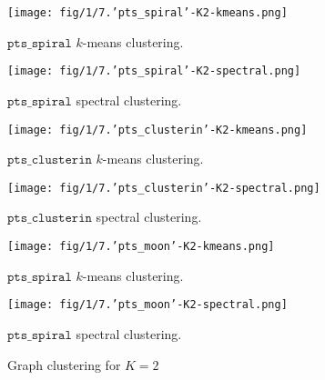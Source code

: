 \documentclass[unicode,11pt,a4paper,oneside,numbers=endperiod,openany]{scrartcl}
\begin{document}
\begin{figure}[h!]
\begin{minipage}{1\textwidth}
    \begin{minipage}{0.5\linewidth}
        \centering
        \texttt{[image: fig/1/7.'pts\_spiral'-K2-kmeans.png]}
        \caption{$\texttt {pts\_spiral}$ $k$-means clustering.}
    \end{minipage}
    \begin{minipage}{0.5\linewidth}
        \centering
        \texttt{[image: fig/1/7.'pts\_spiral'-K2-spectral.png]}
        \caption{$\texttt {pts\_spiral}$ spectral clustering.}
    \end{minipage}
    
    \begin{minipage}{0.5\linewidth}
        \centering
        \texttt{[image: fig/1/7.'pts\_clusterin'-K2-kmeans.png]}
        \caption{$\texttt {pts\_clusterin}$ $k$-means clustering.}
    \end{minipage}
    \begin{minipage}{0.5\linewidth}
        \centering
        \texttt{[image: fig/1/7.'pts\_clusterin'-K2-spectral.png]}
        \caption{$\texttt {pts\_clusterin}$ spectral clustering.}
    \end{minipage}

    \begin{minipage}{0.5\linewidth}
        \centering
        \texttt{[image: fig/1/7.'pts\_moon'-K2-kmeans.png]}
        \caption{$\texttt {pts\_spiral}$ $k$-means clustering.}
    \end{minipage}
    \begin{minipage}{0.5\linewidth}
        \centering
        \texttt{[image: fig/1/7.'pts\_moon'-K2-spectral.png]}
        \caption{$\texttt {pts\_spiral}$ spectral clustering.}
    \end{minipage}
\end{minipage}
    \caption{Graph clustering for $K = 2$}
        \label{fig:clustering-k2}
\end{figure}\\
\end{document}

